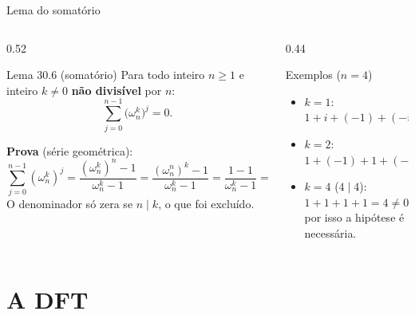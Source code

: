 \documentclass[aspectratio=169,10pt]{beamer}
\newcommand{\w}[2][n]{\omega_{#1}^{#2}}       %
\begin{document}
\begin{frame}{Lema do somatório}
  \begin{columns}[T]
    \begin{column}{0.52\textwidth}
      \begin{block}{Lema 30.6 (somatório)}
        Para todo inteiro $n\ge1$ e inteiro $k\neq 0$ \textbf{não divisível} por $n$:
        \[
          \sum_{j=0}^{n-1} \big(\w{k}\big)^j = 0.
        \]
      \end{block}
      \textbf{Prova} (série geométrica):
      \[
        \sum_{j=0}^{n-1} (\w{k})^j = \frac{(\w{k})^n - 1}{\w{k} - 1}
        = \frac{(\w{n})^k - 1}{\w{k} - 1} = \frac{1 - 1}{\w{k} - 1} = 0.
      \]
      O denominador só zera se $n \mid k$, o que foi excluído.
    \end{column}
    \begin{column}{0.44\textwidth}
      \begin{exampleblock}{Exemplos ($n=4$)}
        \begin{itemize}
          \item $k=1$: $1 + i + (-1) + (-i) = 0$
          \item $k=2$: $1 + (-1) + 1 + (-1) = 0$
          \item $k=4$ ($4 \mid 4$): $1+1+1+1 = 4 \neq 0$\\
                {\small por isso a hipótese é necessária.}
        \end{itemize}
      \end{exampleblock}
      \centering
    \end{column}
  \end{columns}
\end{frame}

\section{A DFT}
\end{document}
